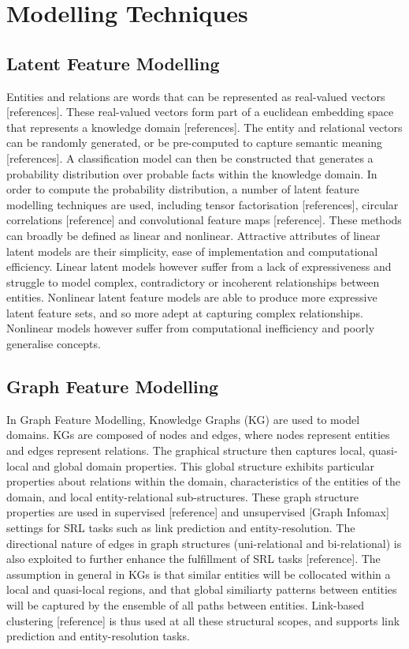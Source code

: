 \section{Modelling Techniques} %

\subsection{Latent Feature Modelling} %
Entities and relations are words that can be represented as real-valued vectors [references]. These real-valued vectors form part of a euclidean embedding space that represents a knowledge domain [references]. The entity and relational vectors can be randomly generated, or be pre-computed to capture semantic meaning [references]. A classification model can then be constructed that generates a probability distribution over probable facts within the knowledge domain. In order to compute the probability distribution, a number of latent feature modelling techniques are used, including tensor factorisation [references], circular correlations [reference] and convolutional feature maps [reference]. These methods can broadly be defined as linear and nonlinear. Attractive attributes of linear latent models are their simplicity, ease of implementation and computational efficiency. Linear latent models however suffer from a lack of expressiveness and struggle to model complex, contradictory or incoherent relationships between entities. Nonlinear latent feature models are able to produce more expressive latent feature sets, and so more adept at capturing complex relationships. Nonlinear models however suffer from computational inefficiency and poorly generalise concepts. \newline
\subsection{Graph Feature Modelling} %
In Graph Feature Modelling, Knowledge Graphs (KG) are used to model domains. KGs are composed of nodes and edges, where nodes represent entities and edges represent relations. The graphical structure then captures local, quasi-local and global domain properties. This global structure exhibits particular properties about relations within the domain, characteristics of the entities of the domain, and local entity-relational sub-structures. These graph structure properties are used in supervised [reference] and unsupervised [Graph Infomax] settings for SRL tasks such as link prediction and entity-resolution. The directional nature of edges in graph structures (uni-relational and bi-relational) is also exploited to further enhance the fulfillment of SRL tasks [reference]. The assumption in general in KGs is that similar entities will be collocated within a local and quasi-local regions, and that global similiarty patterns between entities will be captured by the ensemble of all paths between entities. Link-based clustering [reference] is thus used at all these structural scopes, and supports link prediction and entity-resolution tasks. 
